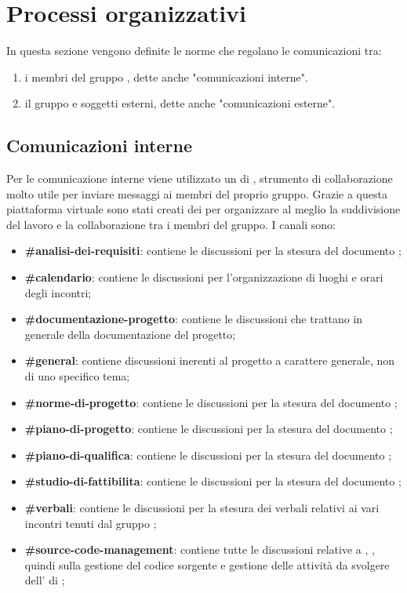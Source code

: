 \section{Processi organizzativi}
In questa sezione vengono definite le norme che regolano le comunicazioni tra:
\begin{enumerate}
	\item i membri del gruppo \Gruppo{}, dette anche "comunicazioni interne".
	\item il gruppo e soggetti esterni, dette anche "comunicazioni esterne".
\end{enumerate}
	
\subsection{Comunicazioni interne}
Per le comunicazione interne viene utilizzato un  di ,
strumento di collaborazione molto utile per inviare messaggi ai membri del proprio gruppo.
Grazie a questa piattaforma virtuale sono stati creati dei  per organizzare al meglio la suddivisione del lavoro e la collaborazione tra i membri del gruppo.
I canali sono:
\begin{itemize}
	\item \textbf{\#analisi-dei-requisiti}: contiene le discussioni per la stesura del documento \AdR{};
	\item \textbf{\#calendario}: contiene le discussioni per l’organizzazione di luoghi e orari degli incontri;
	\item \textbf{\#documentazione-progetto}: contiene le discussioni che trattano in generale della documentazione del progetto;
	\item \textbf{\#general}: contiene discussioni inerenti al progetto a carattere generale, non di uno specifico tema;
	\item \textbf{\#norme-di-progetto}: contiene le discussioni per la stesura del documento \NdP{};
    \item \textbf{\#piano-di-progetto}: contiene le discussioni per la stesura del documento \PdP{};
	\item \textbf{\#piano-di-qualifica}: contiene le discussioni per la stesura del documento \PdQ{};
	\item \textbf{\#studio-di-fattibilita}: contiene le discussioni per la stesura del documento \SdF{};
	\item \textbf{\#verbali}: contiene le discussioni per la stesura dei verbali relativi ai vari incontri tenuti dal gruppo \Gruppo{};
	\item \textbf{\#source-code-management}: contiene tutte le discussioni relative a , , quindi sulla gestione del codice sorgente e gestione delle attività da svolgere dell' di ;
\end{itemize}

